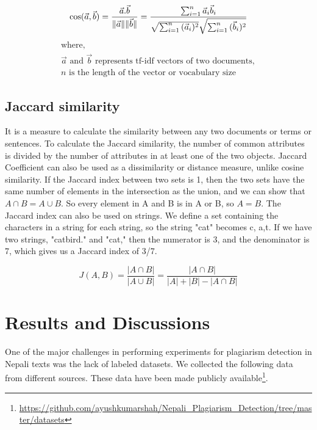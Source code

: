 \documentclass[conference]{IEEEtran}
\begin{document}
\begin{equation}
\cos ({\vec a},{\vec b})= {{\vec a} . {\vec b} \over \|{\vec a}\| \|{\vec b}\|} = \frac{ \sum_{i=1}^{n}{{\vec a}_i{\vec b}_i} }{ \sqrt{\sum_{i=1}^{n}{({\vec a}_i)^2}} \sqrt{\sum_{i=1}^{n}{({\vec b}_i)^2}} } \label{eq5}
\end{equation}
 \begin{gather*}
  \text{where},\\
  \vec a \text{ and } \vec b \text{ represents tf-idf vectors of two documents},\\
  n \text{ is the length of the vector or vocabulary size}
\end{gather*}


\subsection {Jaccard similarity}
It is a measure to calculate the similarity between any two documents or terms
or sentences. To calculate the Jaccard similarity, the number of common
attributes is divided by the number of attributes in at least one of
the two objects. Jaccard Coefficient can also be used as a dissimilarity or
distance measure, unlike cosine similarity. If the Jaccard index between two
sets is 1, then the two sets have the same number of elements in the
intersection as the union, and we can show that ${A \cap B=A \cup B}$. So every
element in A and B is in A or B, so ${A = B}$. The Jaccard index can also be
used on strings. We define a set containing the characters in a
string for each string, so the string "cat" becomes {c, a,t}. If we have two strings, "catbird."
and "cat," then the numerator is 3, and the denominator is 7, which gives us a
Jaccard index of 3/7.

\begin{equation}
J(A,B) = \frac{|A\cap B|}{|A\cup B|}=\frac{|A\cap B|}{|A| + |B| -|A\cap B|}\label{eq6}
\end{equation}
\medskip

\section{Results and Discussions}

One of the major challenges in performing experiments for plagiarism detection
in Nepali texts was the lack of labeled datasets. We collected the following data
from different sources. These data have been made publicly
available\footnote{\url{https://github.com/ayushkumarshah/Nepali_Plagiarism_Detection/tree/master/datasets}}.
\end{document}
